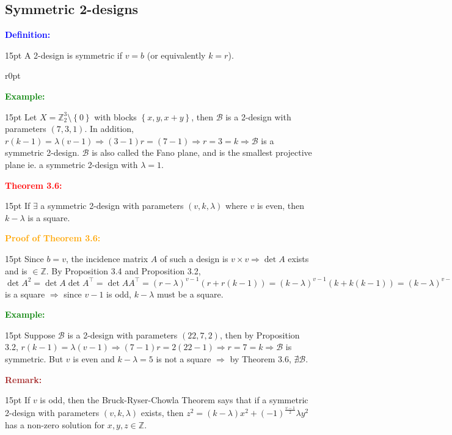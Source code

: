 \documentclass[12pt]{article}
\newcommand{\noparskip}{\vspace{-\parskip}}
\newenvironment{dent}
	{\begin{adjustwidth}{15pt}{}\noparskip}
	{\end{adjustwidth}}
\newenvironment{result}[1]
	{\textcolor{Red}{\textbf{#1:}}\begin{dent}}
	{\end{dent}}
\newenvironment{proof}[1]
	{\textcolor{Orange}{\textbf{Proof of #1:}}\begin{dent}}
	{\end{dent}}
\newenvironment{definition}
	{\textcolor{Blue}{\textbf{Definition:}}\begin{dent}}
	{\end{dent}}
\newenvironment{example}
	{\textcolor{Green}{\textbf{Example:}}\begin{dent}}
	{\end{dent}}
\newenvironment{remark}
	{\textcolor{Brown}{\textbf{Remark:}}\begin{dent}}
	{\end{dent}}
\newcommand{\pic}[2][1.0]{
	$\vcenter{\hbox{\texttt{[image: \#2]}\ }}$}
\newcommand{\wrappic}[2][1.0]{
	\begin{wrapfigure}{r}{0pt}
	\centering
	\raisebox{-3\baselineskip}{\pic[#1]{#2}}
	\end{wrapfigure}}
\renewcommand{\implies}{\Rightarrow}
\newcommand{\set}[1]{\left\{ #1 \right\}}
\newcommand{\Z}{\mathbb{Z}}
\newcommand{\cB}{\mathcal{B}}
\begin{document}
\subsection{Symmetric 2-designs}

\begin{definition}
A 2-design is symmetric if $v = b$ (or equivalently $k = r$).
\end{definition}

\wrappic[0.3]{14.png}
\begin{example}
Let $X = \Z_2^3 \setminus \set{0}$ with blocks $\set{x, y, x + y}$, then $\cB$ is a 2-design with parameters $(7, 3, 1)$. In addition, $r(k - 1) = \lambda (v - 1) \implies (3 - 1)r = (7 - 1) \implies r = 3 = k \implies \cB$ is a symmetric 2-design. $\cB$ is also called the Fano plane, and is the smallest projective plane ie. a symmetric 2-design with $\lambda = 1$.
\end{example}

\begin{result}{Theorem 3.6}
If $\exists$ a symmetric 2-design with parameters $(v, k, \lambda)$ where $v$ is even, then $k - \lambda$ is a square.
\end{result}

\begin{proof}{Theorem 3.6}
Since $b = v$, the incidence matrix $A$ of such a design is $v \times v \implies \det{A}$ exists and is $\in \Z$. By Proposition 3.4 and Proposition 3.2, $\det{A}^2 = \det{A} \det{A^\top} = \det{AA^\top} = (r - \lambda)^{v - 1} (r + r(k - 1)) = (k - \lambda)^{v - 1} (k + k(k - 1)) = (k - \lambda)^{v - 1} k^2 \implies (k - \lambda)^{v - 1}$ is a square $\implies$ since $v - 1$ is odd, $k - \lambda$ must be a square.
\end{proof}

\begin{example}
Suppose $\cB$ is a 2-design with parameters $(22, 7, 2)$, then by Proposition 3.2, $r(k - 1) = \lambda (v - 1) \implies (7 - 1)r = 2(22 - 1) \implies r = 7 = k \implies \cB$ is symmetric. But $v$ is even and $k - \lambda = 5$ is not a square $\implies$ by Theorem 3.6, $\nexists \cB$.
\end{example}

\begin{remark}
If $v$ is odd, then the Bruck-Ryser-Chowla Theorem says that if a symmetric 2-design with parameters $(v, k, \lambda)$ exists, then $z^2 = (k - \lambda)x^2 + (-1)^\frac{v - 1}{2} \lambda y^2$ has a non-zero solution for $x, y, z \in \Z$.
\end{remark}
\end{document}
